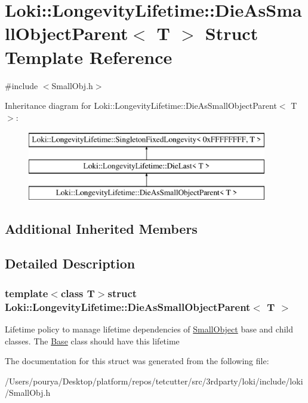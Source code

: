 \hypertarget{structLoki_1_1LongevityLifetime_1_1DieAsSmallObjectParent}{}\section{Loki\+:\+:Longevity\+Lifetime\+:\+:Die\+As\+Small\+Object\+Parent$<$ T $>$ Struct Template Reference}
\label{structLoki_1_1LongevityLifetime_1_1DieAsSmallObjectParent}


{\ttfamily \#include $<$Small\+Obj.\+h$>$}

Inheritance diagram for Loki\+:\+:Longevity\+Lifetime\+:\+:Die\+As\+Small\+Object\+Parent$<$ T $>$\+:\begin{figure}[H]
\begin{center}
\leavevmode
\includegraphics[height=3.000000cm]{structLoki_1_1LongevityLifetime_1_1DieAsSmallObjectParent}
\end{center}
\end{figure}
\subsection*{Additional Inherited Members}


\subsection{Detailed Description}
\subsubsection*{template$<$class T$>$struct Loki\+::\+Longevity\+Lifetime\+::\+Die\+As\+Small\+Object\+Parent$<$ T $>$}

Lifetime policy to manage lifetime dependencies of \hyperlink{classLoki_1_1SmallObject}{Small\+Object} base and child classes. The \hyperlink{structBase}{Base} class should have this lifetime 

The documentation for this struct was generated from the following file\+:\begin{DoxyCompactItemize}
\item 
/\+Users/pourya/\+Desktop/platform/repos/tetcutter/src/3rdparty/loki/include/loki/Small\+Obj.\+h\end{DoxyCompactItemize}
